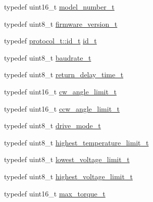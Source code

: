 \begin{DoxyCompactItemize}
\item 
typedef uint16\+\_\+t \hyperlink{structdynamixel_1_1servos_1_1_model_traits_3_01_ex106_01_4_1_1_c_t_a07c5df06e773fd5771625d505c3de0ca}{model\+\_\+number\+\_\+t}
\item 
typedef uint8\+\_\+t \hyperlink{structdynamixel_1_1servos_1_1_model_traits_3_01_ex106_01_4_1_1_c_t_ac8f660f966bf29c3c736aa9e9d1443f8}{firmware\+\_\+version\+\_\+t}
\item 
typedef \hyperlink{classdynamixel_1_1protocols_1_1_protocol1_a1d4dfa22b01f80b1876d14f539d52b5c}{protocol\+\_\+t\+::id\+\_\+t} \hyperlink{structdynamixel_1_1servos_1_1_model_traits_3_01_ex106_01_4_1_1_c_t_a285b3a76ceab67451ee5bcbe074d3272}{id\+\_\+t}
\item 
typedef uint8\+\_\+t \hyperlink{structdynamixel_1_1servos_1_1_model_traits_3_01_ex106_01_4_1_1_c_t_a8c4151bb3b423c0762b71628baa77abd}{baudrate\+\_\+t}
\item 
typedef uint8\+\_\+t \hyperlink{structdynamixel_1_1servos_1_1_model_traits_3_01_ex106_01_4_1_1_c_t_a81f1c424b45176e7a63edf9aa7dd2101}{return\+\_\+delay\+\_\+time\+\_\+t}
\item 
typedef uint16\+\_\+t \hyperlink{structdynamixel_1_1servos_1_1_model_traits_3_01_ex106_01_4_1_1_c_t_afca1ab1b074dd77da2fd15a6c9c1c7a1}{cw\+\_\+angle\+\_\+limit\+\_\+t}
\item 
typedef uint16\+\_\+t \hyperlink{structdynamixel_1_1servos_1_1_model_traits_3_01_ex106_01_4_1_1_c_t_a1f579ef8e070c4addc7a1192c3377cab}{ccw\+\_\+angle\+\_\+limit\+\_\+t}
\item 
typedef uint8\+\_\+t \hyperlink{structdynamixel_1_1servos_1_1_model_traits_3_01_ex106_01_4_1_1_c_t_a8a1a8bfea005f9c16869c5bc1210a6ba}{drive\+\_\+mode\+\_\+t}
\item 
typedef uint8\+\_\+t \hyperlink{structdynamixel_1_1servos_1_1_model_traits_3_01_ex106_01_4_1_1_c_t_acac4c76b00364da32c031be264b9c2ad}{highest\+\_\+temperature\+\_\+limit\+\_\+t}
\item 
typedef uint8\+\_\+t \hyperlink{structdynamixel_1_1servos_1_1_model_traits_3_01_ex106_01_4_1_1_c_t_a658e23da498355e3ffe4e5321e1bb411}{lowest\+\_\+voltage\+\_\+limit\+\_\+t}
\item 
typedef uint8\+\_\+t \hyperlink{structdynamixel_1_1servos_1_1_model_traits_3_01_ex106_01_4_1_1_c_t_a807879ecc28b22f92438427f7c7f58fb}{highest\+\_\+voltage\+\_\+limit\+\_\+t}
\item 
typedef uint16\+\_\+t \hyperlink{structdynamixel_1_1servos_1_1_model_traits_3_01_ex106_01_4_1_1_c_t_a636b107463425ecc0800b64d126ef797}{max\+\_\+torque\+\_\+t}

\end{DoxyCompactItemize}
